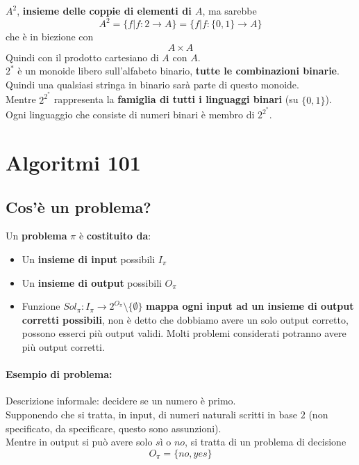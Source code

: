 \documentclass[11pt]{article}
\begin{document}
	\newpage
	
	$A^2$, \textbf{insieme delle coppie di elementi di $A$}, ma sarebbe 
	$$ A^2 = \{f | f : 2 \rightarrow A\} = \{f|f : \{0,1\} \rightarrow A\} $$
	che è in biezione con
	$$ A \times A $$
	Quindi con il prodotto cartesiano di $A$ con $A$.\\
	
	$2^\ast$ è un monoide libero sull'alfabeto binario, \textbf{tutte le combinazioni binarie}. Quindi una qualsiasi stringa in binario sarà parte di questo monoide.\\
	
	Mentre $2^{2^\ast}$ rappresenta la \textbf{famiglia di tutti i linguaggi binari} (su $\{0,1\}$).\\
	Ogni linguaggio che consiste di numeri binari è membro di $2^{2^\ast}$.\\
	
	\newpage
	
	\section{Algoritmi 101}
	
	\subsection{Cos'è un problema?} 
	
	Un \textbf{problema} $\pi$ è \textbf{costituito da}:
	\begin{itemize}
		\item Un \textbf{insieme di input} possibili $I_\pi$
		
		\item Un \textbf{insieme di output} possibili $O_\pi$
		
		\item Funzione $Sol_\pi: I_\pi \rightarrow 2^{O_\pi} \setminus \{\emptyset\}$ \textbf{mappa ogni input ad un insieme di output corretti possibili}, non è detto che dobbiamo avere un solo output corretto, possono esserci più output validi. Molti problemi considerati potranno avere più output corretti.
	\end{itemize}
	
	\paragraph{Esempio di problema:} Descrizione informale: decidere se un numero è primo. \\
	
	Supponendo che si tratta, in input, di numeri naturali scritti in base $2$ (non specificato, da specificare, questo sono assunzioni).\\
	Mentre in output si può avere solo $sì$ o $no$, si tratta di un problema di decisione
	$$ O_\pi = \{no, yes\} $$
	
\end{document}
